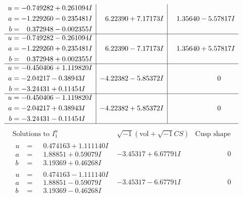 \documentclass[1p]{elsarticle_modified}
\theoremstyle{definition}
\newcommand{\I}{\sqrt{-1}}
\begin{document}
$$\begin{array}{c|c|c}
\begin{aligned}
u &= -0.749282 + 0.261094 I \\
a &= -1.229260 - 0.235481 I \\
b &= \phantom{-}0.372948 - 0.002355 I\end{aligned}
 & \phantom{-}6.22390 + 7.17173 I & \phantom{-}1.35640 - 5.57817 I \\ \hline\begin{aligned}
u &= -0.749282 - 0.261094 I \\
a &= -1.229260 + 0.235481 I \\
b &= \phantom{-}0.372948 + 0.002355 I\end{aligned}
 & \phantom{-}6.22390 - 7.17173 I & \phantom{-}1.35640 + 5.57817 I \\ \hline\begin{aligned}
u &= -0.450406 + 1.119820 I \\
a &= -2.04217 - 0.38943 I \\
b &= -3.24431 + 0.11454 I\end{aligned}
 & -4.22382 - 5.85372 I & \phantom{-0.000000 } 0 \\ \hline\begin{aligned}
u &= -0.450406 - 1.119820 I \\
a &= -2.04217 + 0.38943 I \\
b &= -3.24431 - 0.11454 I\end{aligned}
 & -4.22382 + 5.85372 I & \phantom{-0.000000 } 0\\
 \hline 
 \end{array}$$\newpage$$\begin{array}{c|c|c}  
\text{Solutions to }I^u_{1}& \I (\text{vol} + \sqrt{-1}CS) & \text{Cusp shape}\\
 \hline 
\begin{aligned}
u &= \phantom{-}0.474163 + 1.111140 I \\
a &= \phantom{-}1.88851 + 0.59079 I \\
b &= \phantom{-}3.19369 + 0.46268 I\end{aligned}
 & -3.45317 + 6.67791 I & \phantom{-0.000000 } 0 \\ \hline\begin{aligned}
u &= \phantom{-}0.474163 - 1.111140 I \\
a &= \phantom{-}1.88851 - 0.59079 I \\
b &= \phantom{-}3.19369 - 0.46268 I\end{aligned}
 & -3.45317 - 6.67791 I & \phantom{-0.000000 } 0 \\ \hline\begin{aligned}

\end{aligned}
\end{array}$$
\end{document}
